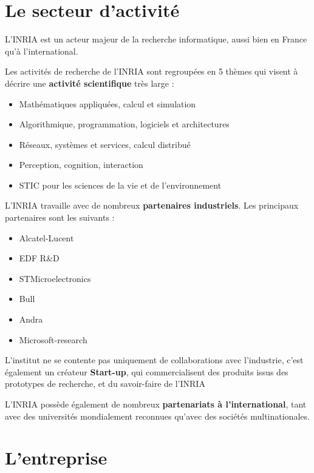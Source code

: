 \documentclass[a4paper, 11pt]{report}
\begin{document}
  \section{Le secteur d'activité}
  L'INRIA est un acteur majeur de la recherche informatique, aussi bien en
  France qu'à l'international.

  Les activités de recherche de l'INRIA sont regroupées en 5 thèmes qui visent
  à décrire une \textbf{activité scientifique} très large :
  \begin{itemize}
    \item Mathématiques appliquées, calcul et simulation
    \item Algorithmique, programmation, logiciels et architectures
    \item Réseaux, systèmes et services, calcul distribué
    \item Perception, cognition, interaction
    \item STIC pour les sciences de la vie et de l'environnement
  \end{itemize}

  L'INRIA travaille avec de nombreux \textbf{partenaires industriels}.
  Les principaux partenaires sont les suivants :
  \begin{itemize}
    \item Alcatel-Lucent
    \item EDF R\&D
    \item STMicroelectronics
    \item Bull
    \item Andra
    \item Microsoft-research \\
  \end{itemize}

  L'institut ne se contente pas uniquement de collaborations avec l'industrie,
  c'est également un créateur \textbf{Start-up}, qui commercialisent des
  produits issus des prototypes de recherche, et du savoir-faire de l'INRIA

  L'INRIA possède également de nombreux \textbf{partenariats à
  l'international}, tant avec des universités mondialement reconnues qu'avec
  des sociétés multinationales.

  \section{L'entreprise}
\end{document}
